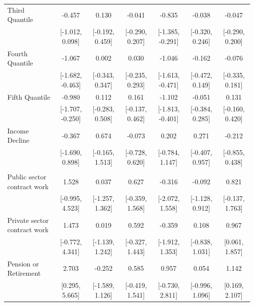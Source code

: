 \documentclass[
  10,
  letterpaper,
  DIV=11,
  numbers=noendperiod]{scrartcl}
\begin{document}
\begin{table}
\begin{tabular}[t]{lcccccc}
\hspace{1em}Third Quantile & -0.457 & 0.130 & -0.041 & -0.835 & -0.038 & -0.047\\
\hspace{1em} & {}[-1.012, 0.098] & {}[-0.192, 0.459] & {}[-0.290, 0.207] & {}[-1.385, -0.291] & {}[-0.320, 0.246] & {}[-0.290, 0.200]\\
\hspace{1em}Fourth Quantile & -1.067 & 0.002 & 0.030 & -1.046 & -0.162 & -0.076\\
\hspace{1em} & {}[-1.682, -0.463] & {}[-0.343, 0.347] & {}[-0.235, 0.293] & {}[-1.613, -0.471] & {}[-0.472, 0.149] & {}[-0.335, 0.181]\\
\hspace{1em}Fifth Quantile & -0.980 & 0.112 & 0.161 & -1.102 & -0.051 & 0.131\\
\hspace{1em} & {}[-1.707, -0.250] & {}[-0.283, 0.508] & {}[-0.137, 0.462] & {}[-1.813, -0.401] & {}[-0.384, 0.285] & {}[-0.160, 0.420]\\
\hspace{1em}Income Decline & -0.367 & 0.674 & -0.073 & 0.202 & 0.271 & -0.212\\
\hspace{1em} & {}[-1.690, 0.898] & {}[-0.165, 1.513] & {}[-0.728, 0.620] & {}[-0.784, 1.147] & {}[-0.407, 0.957] & {}[-0.855, 0.438]\\
\addlinespace[0.3em]
\multicolumn{7}{l}{\cellcolor[HTML]{3498DB}{\textbf{Income Source}}}\\
\hspace{1em}Public sector contract work & 1.528 & 0.037 & 0.627 & -0.316 & -0.092 & 0.821\\
\hspace{1em} & {}[-0.995, 4.523] & {}[-1.257, 1.362] & {}[-0.359, 1.568] & {}[-2.072, 1.558] & {}[-1.128, 0.912] & {}[-0.137, 1.763]\\
\hspace{1em}Private sector contract work & 1.473 & 0.019 & 0.592 & -0.359 & 0.108 & 0.967\\
\hspace{1em} & {}[-0.772, 4.341] & {}[-1.139, 1.242] & {}[-0.327, 1.443] & {}[-1.912, 1.353] & {}[-0.838, 1.031] & {}[0.061, 1.857]\\
\hspace{1em}Pension or Retirement & 2.703 & -0.252 & 0.585 & 0.957 & 0.054 & 1.142\\
\hspace{1em} & {}[0.295, 5.665] & {}[-1.589, 1.126] & {}[-0.419, 1.541] & {}[-0.730, 2.811] & {}[-0.996, 1.096] & {}[0.169, 2.107]\\

\end{tabular}
\end{table}
\end{document}
